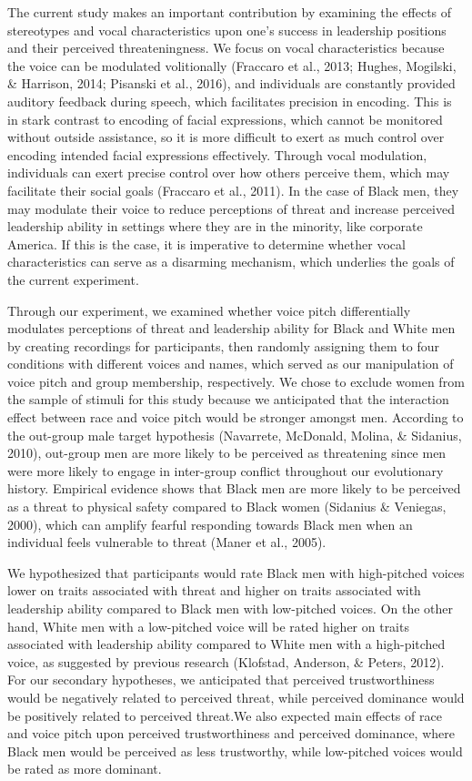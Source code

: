 \documentclass[
  english,
  man, noextraspace,floatsintext]{apa6}
\begin{document}
The current study makes an important contribution by examining the effects of stereotypes and vocal characteristics upon one's success in leadership positions and their perceived threateningness. We focus on vocal characteristics because the voice can be modulated volitionally (Fraccaro et al., 2013; Hughes, Mogilski, \& Harrison, 2014; Pisanski et al., 2016), and individuals are constantly provided auditory feedback during speech, which facilitates precision in encoding. This is in stark contrast to encoding of facial expressions, which cannot be monitored without outside assistance, so it is more difficult to exert as much control over encoding intended facial expressions effectively. Through vocal modulation, individuals can exert precise control over how others perceive them, which may facilitate their social goals (Fraccaro et al., 2011). In the case of Black men, they may modulate their voice to reduce perceptions of threat and increase perceived leadership ability in settings where they are in the minority, like corporate America. If this is the case, it is imperative to determine whether vocal characteristics can serve as a disarming mechanism, which underlies the goals of the current experiment.

Through our experiment, we examined whether voice pitch differentially modulates perceptions of threat and leadership ability for Black and White men by creating recordings for participants, then randomly assigning them to four conditions with different voices and names, which served as our manipulation of voice pitch and group membership, respectively. We chose to exclude women from the sample of stimuli for this study because we anticipated that the interaction effect between race and voice pitch would be stronger amongst men. According to the out-group male target hypothesis (Navarrete, McDonald, Molina, \& Sidanius, 2010), out-group men are more likely to be perceived as threatening since men were more likely to engage in inter-group conflict throughout our evolutionary history. Empirical evidence shows that Black men are more likely to be perceived as a threat to physical safety compared to Black women (Sidanius \& Veniegas, 2000), which can amplify fearful responding towards Black men when an individual feels vulnerable to threat (Maner et al., 2005).

We hypothesized that participants would rate Black men with high-pitched voices lower on traits associated with threat and higher on traits associated with leadership ability compared to Black men with low-pitched voices. On the other hand, White men with a low-pitched voice will be rated higher on traits associated with leadership ability compared to White men with a high-pitched voice, as suggested by previous research (Klofstad, Anderson, \& Peters, 2012). For our secondary hypotheses, we anticipated that perceived trustworthiness would be negatively related to perceived threat, while perceived dominance would be positively related to perceived threat.We also expected main effects of race and voice pitch upon perceived trustworthiness and perceived dominance, where Black men would be perceived as less trustworthy, while low-pitched voices would be rated as more dominant.
\end{document}
